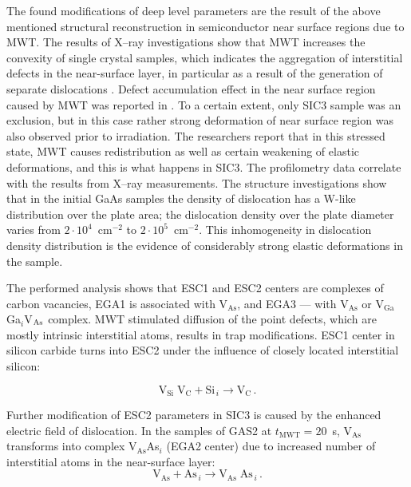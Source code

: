 \documentclass[10pt]{iopart}
\begin{document}
The found modifications of deep level parameters are the result of the above mentioned
structural reconstruction in semiconductor near surface regions  due to MWT.
The results of X--ray investigations show that MWT increases the convexity of single crystal samples,
which indicates the aggregation of interstitial defects in the near-surface layer,
in particular as a result of the generation of separate dislocations \cite{BoltovetsEn,Konakova2012FTPEn}.
Defect accumulation effect in the near surface region caused by MWT was reported in \cite{BoltovetsEn,Konakova2015En}.
To a certain extent, only SIC3 sample was an exclusion, but in this case rather strong deformation of near surface region was also observed prior to irradiation.
The researchers report \cite{Bacherikov2003En,Pashkov1994En,BoltovetsEn,Milenin1994En,BelyaevIntac} that in this stressed state,
MWT causes redistribution as well as certain weakening of elastic deformations, and this is what happens in SIC3.
The profilometry data correlate with the results from X--ray measurements.
The structure investigations show that
in the initial GaAs samples the density of dislocation has a W-like distribution over the plate area; the dislocation density over the plate diameter varies from $2\cdot10^{4}$~cm$^{-2}$ to $2\cdot10^{5}$~cm$^{-2}$.
This inhomogeneity in dislocation density distribution is the evidence of considerably strong elastic deformations in the sample.

The performed analysis shows that ESC1 and ESC2 centers are complexes of carbon vacancies,
EGA1 is associated with V$_\mathrm{As}$,
and EGA3 — with V$_\mathrm{As}$ or  V$_\mathrm{Ga}$Ga$_i$V$_{\rm As}$ complex.
MWT stimulated diffusion of the point defects, which are mostly intrinsic interstitial atoms, results in trap modifications.
ESC1 center in silicon carbide turns into ESC2 under the influence of closely located interstitial silicon:

\begin{equation*}
\mathrm{V}_\mathrm{Si}\;\mathrm{V}_\mathrm{C}+\mathrm{Si}_{\,i} \rightarrow
   \mathrm{V}_\mathrm{C}\,.
\end{equation*}

Further modification of ESC2 parameters in SIC3 is caused by the enhanced electric field of dislocation.
In the samples of GAS2 at $t_\mathrm{MWT}=20$~s,
V$_\mathrm{As}$ transforms into complex V$_\mathrm{As}$As$_i$
(EGA2 center)
due to increased number of interstitial atoms in the near-surface layer:
\begin{equation*}
\mathrm{V}_\mathrm{As}+ \mathrm{As}_{\,i} \rightarrow \mathrm{V}_\mathrm{As}\;\mathrm{As}_{\,i}\,.
\end{equation*}
\end{document}
